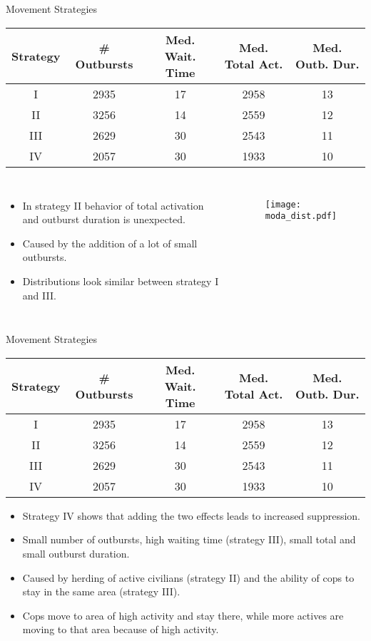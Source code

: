 \documentclass[red]{beamer}
\begin{document}
\begin{frame}{Movement Strategies}
  \begin{table}[H]
    \scriptsize
    \centering
    \begin{tabular}{c | c | c | c | c}
      Strategy & \# Outbursts & Med. Wait. Time & Med. Total Act. & Med. Outb. Dur. \\
      \hline
      I & 2935 & 17 & 2958 & 13 \\
      II & 3256 & 14 & 2559 & 12 \\
      III & 2629 & 30 & 2543 & 11 \\
      IV & 2057 & 30 & 1933 & 10
    \end{tabular}
    \label{tab:results}
  \end{table}
  \begin{columns}
    \column{2.0in}
    \begin{itemize}
    \item
      In strategy II behavior of total activation and outburst duration is unexpected.
    \item
      Caused by the addition of a lot of small outbursts.
    \item
      Distributions look similar between strategy I and III.
    \end{itemize}

    \column{2.5in}
    \begin{figure}[H]
      \centering
      \texttt{[image: moda\_dist.pdf]}
      \label{fig:strategy2}
    \end{figure}
  \end{columns}
\end{frame}

\begin{frame}{Movement Strategies}
  \begin{table}[H]
    \footnotesize
    \centering
    \begin{tabular}{c | c | c | c | c}
      Strategy & \# Outbursts & Med. Wait. Time & Med. Total Act. & Med. Outb. Dur. \\
      \hline
      I & 2935 & 17 & 2958 & 13 \\
      II & 3256 & 14 & 2559 & 12 \\
      III & 2629 & 30 & 2543 & 11 \\
      IV & 2057 & 30 & 1933 & 10
    \end{tabular}
    \label{tab:results}
  \end{table}
  \begin{itemize}
  \item
    Strategy IV shows that adding the two effects leads to increased suppression.
  \item
    Small number of outbursts, high waiting time (strategy III), small total and small outburst duration.
  \item
    Caused by herding of active civilians (strategy II) and the ability of cops to stay in the same area (strategy III).
  \item
    Cops move to area of high activity and stay there, while more actives are moving to that area because of high activity.
  \end{itemize}
\end{frame}
\end{document}

